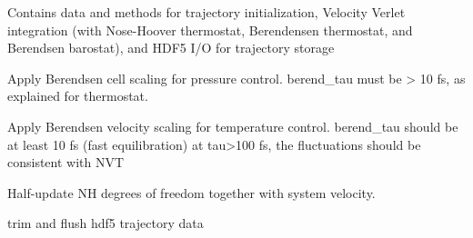 \documentclass[letterpaper,10pt,english]{sphinxmanual}
\begin{document}
\begin{fulllineitems}
\label{\detokenize{drivers:drivers.bim_md.Integrator}}
Contains data and methods for trajectory initialization,
Velocity Verlet integration (with Nose-Hoover thermostat, Berendensen
thermostat, and Berendsen barostat), and HDF5 I/O for trajectory storage

\begin{fulllineitems}
\label{\detokenize{drivers:drivers.bim_md.Integrator.apply_berend_baro}}
Apply Berendsen cell scaling for pressure control.
berend\_tau must be \textgreater{} 10 fs, as explained for thermostat.

\end{fulllineitems}


\begin{fulllineitems}
\label{\detokenize{drivers:drivers.bim_md.Integrator.apply_berend_thermo}}
Apply Berendsen velocity scaling for temperature control.
berend\_tau should be at least 10 fs (fast equilibration)
at tau\textgreater{}100 fs, the fluctuations should be consistent with NVT

\end{fulllineitems}


\begin{fulllineitems}
\label{\detokenize{drivers:drivers.bim_md.Integrator.apply_nose_chain}}
Half-update NH degrees of freedom together with
system velocity.

\end{fulllineitems}


\begin{fulllineitems}
\label{\detokenize{drivers:drivers.bim_md.Integrator.clean_up}}
trim and flush hdf5 trajectory data

\end{fulllineitems}


\end{fulllineitems}
\end{document}
